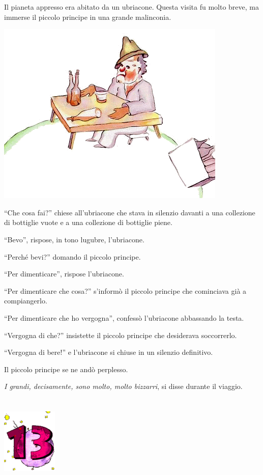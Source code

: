 \documentclass[11pt]{scrbook}
\begin{document}
Il pianeta appresso era abitato da un ubriacone. Questa visita fu molto breve, ma immerse il piccolo principe in una grande malinconia.

\begin{center}
\includegraphics{img/12a}
\end{center}

``Che cosa fai?'' chiese all'ubriacone che stava in silenzio davanti a una collezione di bottiglie vuote e a una collezione di bottiglie piene.

``Bevo'', rispose, in tono lugubre, l'ubriacone.

``Perché bevi?'' domando il piccolo principe.

``Per dimenticare'', rispose l'ubriacone.

``Per dimenticare che cosa?'' s'informò il piccolo principe che cominciava già a compiangerlo.

``Per dimenticare che ho vergogna'', confessò l'ubriacone abbassando la testa.

``Vergogna di che?'' insistette il piccolo principe che desiderava soccorrerlo.

``Vergogna di bere!'' e l'ubriacone si chiuse in un silenzio definitivo.

Il piccolo principe se ne andò perplesso.

\emph{I grandi, decisamente, sono molto, molto bizzarri}, si disse durante il viaggio.

\chapter{}
\begin{center}
\includegraphics{img/chapter13}
\end{center}
\end{document}
